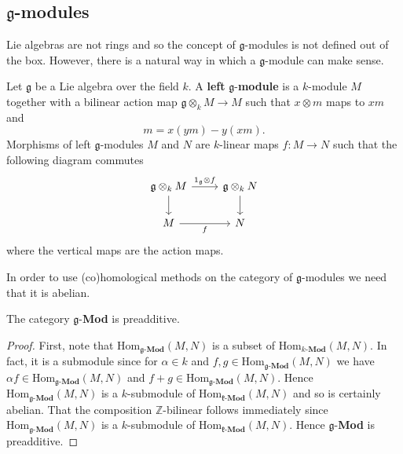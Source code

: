\subsection{$\mathfrak{g}$-modules} %
\label{sub:g-modules}
Lie algebras are not rings and so the concept of $ \mathfrak{g} $-modules is not defined out of the box. However, there is a natural way in which a $ \mathfrak{g} $-module can make sense.
\begin{definition}
  Let $ \mathfrak{g} $ be a Lie algebra over the field $ k $. A \textbf{left} $ \mathfrak{g} $-\textbf{module} is a $ k $-module $ M $ together with a bilinear action map $ \mathfrak{g} \otimes_k M \to M $ such that $ x \otimes m $ maps to $ xm $ and
  \begin{equation}
    [x,y]m = x(ym) - y(xm).
    \label{eq:whoknow}
  \end{equation}
  Morphisms of left $ \mathfrak{g} $-modules $ M $ and $ N $ are $ k $-linear maps
  $ f: M \to N $ such that the following diagram commutes
  \[\begin{tikzcd}
	  {\mathfrak{g} \otimes_k M} & {\mathfrak{g} \otimes_k N} \\
	  M & N
	  \arrow[from=1-1, to=2-1]
	  \arrow["f"', from=2-1, to=2-2]
	  \arrow[from=1-2, to=2-2]
	  \arrow["{\text{1}_\mathfrak{g} \otimes f}", from=1-1, to=1-2]
  \end{tikzcd}\]
  where the vertical maps are the action maps.
\end{definition}

In order to use (co)homological methods on the category of $ \mathfrak{g} $-modules we need that it is abelian.
\begin{lemma}
  The category $ \mathfrak{g} $-\textbf{Mod} is preadditive.
\end{lemma}
\begin{proof}
  First, note that $ \text{Hom}_{\mathfrak{g}\text{-}\mathbf{Mod}}(M, N) $ is a subset of $ \text{Hom}_{k\text{-}\mathbf{Mod}}(M, N) $. In fact, it is a submodule since for $ \alpha \in k $ and $ f,g \in  \text{Hom}_{\mathfrak{g}\text{-}\mathbf{Mod}}(M, N) $ we have $ \alpha f \in  \text{Hom}_{\mathfrak{g}\text{-}\mathbf{Mod}}(M, N)  $ and $ f + g \in  \text{Hom}_{\mathfrak{g}\text{-}\mathbf{Mod}}(M, N)  $. Hence $  \text{Hom}_{\mathfrak{g}\text{-}\mathbf{Mod}}(M, N)  $ is a $ k $-submodule of $  \text{Hom}_{\mathfrak{k}\text{-}\mathbf{Mod}}(M, N)  $ and so is certainly abelian. That the composition $ \mathbb{Z} $-bilinear follows immediately since $  \text{Hom}_{\mathfrak{g}\text{-}\mathbf{Mod}}(M, N)  $ is a $ k $-submodule of $  \text{Hom}_{\mathfrak{k}\text{-}\mathbf{Mod}}(M, N)  $. Hence $ \mathfrak{g} $-\textbf{Mod} is preadditive.
\end{proof}

